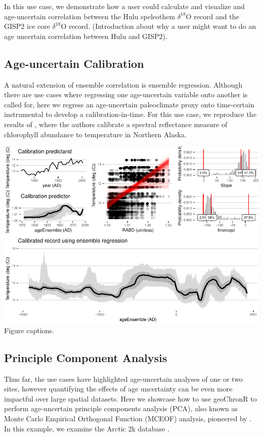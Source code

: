 \documentclass[gc, manuscript]{copernicus}
\begin{document}
In this use case, we demonstrate how a user could calculate and
visualize and age-uncertain correlation between the Hulu speleothem
\(\delta^{18}\mathrm{O}\) record and the GISP2 ice core
\(\delta^{18}\mathrm{O}\) record. (Introduction about why a user might
want to do an age uncertain correlation between Hulu and GISP2).

\subsection{Age-uncertain Calibration}

A natural extension of ensemble correlation is ensemble regression.
Although there are use cases where regressing one age-uncertain variable
onto another is called for, here we regress an age-uncertain
paleoclimate proxy onto time-certain instrumental to develop a
calibration-in-time. For this use case, we reproduce the results of
\citet{Boldt:2015}, where the authors calibrate a spectral reflectance
measure of chlorophyll abundance to temperature in Northern Alaska.

\includegraphics{geoChronR-paper_files/figure-latex/unnamed-chunk-9-1.pdf}
Figure captions.

\subsection{Principle Component Analysis}

Thus far, the use cases have highlighted age-uncertain analyses of one
or two sites, however quantifying the effects of age uncertainty can be
even more impactful over large spatial datasets. Here we showcase how to
use geoChronR to perform age-uncertain principle components analysis
(PCA), also known as Monte Carlo Empirical Orthogonal Function (MCEOF)
analysis, pioneered by \citet{anchukaitis2013mceof}. In this example, we
examine the Arctic 2k database \citep{McKayKaufman2014McKayKaufman2014}.
\end{document}

